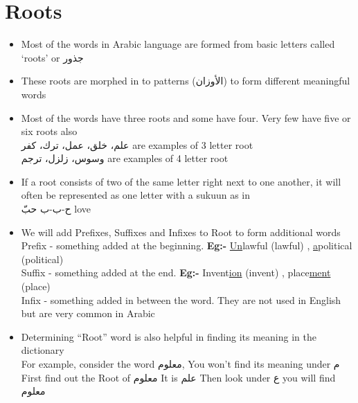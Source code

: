 \section{Roots}
\begin{itemize}	    \setlength{\itemsep}{5pt}
	\item Most of the words in Arabic language are formed from basic letters called `roots' or \textarabic{جذور}
	\item These roots are morphed in to patterns (\textarabic{الأوزان}) to form different meaningful words
	\item Most of the words have three roots and some have four. Very few have five or six roots also \\
	\textarabic{علم، خلق، عمل، ترك، كفر} are examples of 3 letter root \\
	\textarabic{وسوس، زلزل، ترجم} are examples of 4 letter root
	
	\item  If a root consists of two of the same letter right next to one another, it will often be represented as one letter with a \textarabic{sukuun} as in\\
		\textarabic{ح-ب-ب} \qquad \textarabic{حبّ} \qquad love
	
	\item We will add Prefixes, Suffixes and
	Infixes to Root to form additional
	words \\
	
	Prefix - something added at the beginning. \textbf{Eg:-}
	\underline{Un}lawful (lawful) , \underline{a}political (political) \\
	Suffix - something added at the end. \textbf{Eg:-}
	Invent\underline{ion} (invent) , place\underline{ment} 	(place) \\
	Infix - something added in 	between the word. 
	They are not used in English but are very common in Arabic
	
	
	 

	
	
	\item Determining “Root” word is also helpful
	in finding its meaning in the dictionary \\
	For example, consider the word \textarabic{معلوم}, You won’t find its meaning under \textarabic{م} \\
	First find out the Root of \textarabic{معلوم} It is \textarabic{علم}
	Then look under \textarabic{ع} you will find \textarabic{معلوم}
	
	
\end{itemize}
